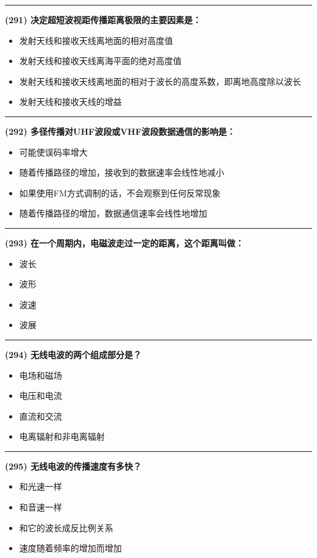 \documentclass[twocolumn]{ctexart}  %
\begin{document}
\noindent\rule{0.5\textwidth}{1pt}
\heiti \textbf{(291) 决定超短波视距传播距离极限的主要因素是：} \songti {\color{gray} [LK1068] }
\begin{itemize}
	\item  发射天线和接收天线离地面的相对高度值
	\item  发射天线和接收天线离海平面的绝对高度值
	\item  发射天线和接收天线离地面的相对于波长的高度系数，即离地高度除以波长
	\item  发射天线和接收天线的增益
\end{itemize}


\noindent\rule{0.5\textwidth}{1pt}
\heiti \textbf{(292) 多径传播对UHF波段或VHF波段数据通信的影响是：} \songti {\color{gray} [LK1104] }
\begin{itemize}
	\item  可能使误码率增大
	\item  随着传播路径的增加，接收到的数据速率会线性地减小
	\item  如果使用FM方式调制的话，不会观察到任何反常现象
	\item  随着传播路径的增加，数据通信速率会线性地增加
\end{itemize}


\noindent\rule{0.5\textwidth}{1pt}
\heiti \textbf{(293) 在一个周期内，电磁波走过一定的距离，这个距离叫做：} \songti {\color{gray} [LK1106] }
\begin{itemize}
	\item  波长
	\item  波形
	\item  波速
	\item  波展
\end{itemize}


\noindent\rule{0.5\textwidth}{1pt}
\heiti \textbf{(294) 无线电波的两个组成部分是？} \songti {\color{gray} [LK1108] }
\begin{itemize}
	\item  电场和磁场
	\item  电压和电流
	\item  直流和交流
	\item  电离辐射和非电离辐射
\end{itemize}


\noindent\rule{0.5\textwidth}{1pt}
\heiti \textbf{(295) 无线电波的传播速度有多快？} \songti {\color{gray} [LK1109] }
\begin{itemize}
	\item  和光速一样
	\item  和音速一样
	\item  和它的波长成反比例关系
	\item  速度随着频率的增加而增加
\end{itemize}
\end{document}
